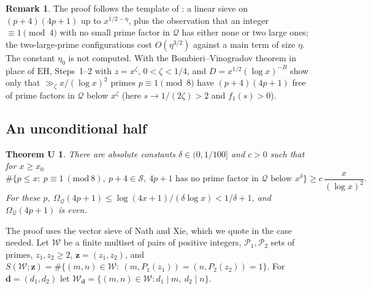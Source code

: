 \documentclass[11pt,reqno]{amsart}
\newtheorem*{thmU}{Theorem U}
\theoremstyle{definition}
\newtheorem{remark}[theorem]{Remark}
\newcommand{\cS}{\mathcal S}
\newcommand{\cQ}{\mathcal Q}
\newcommand{\EH}{\mathrm{EH}}
\begin{document}
\begin{remark}
The proof follows the template of \cite[\S6]{FI09}: a linear sieve on
$(p+4)(4p+1)$ up to $x^{1/2-\eta}$, plus the observation that an
integer $\equiv1\pmod 4$ with no small prime factor in $\cQ$ has either
none or two large ones; the two-large-prime configurations cost
$O(\eta^{3/2})$ against a main term of size $\eta$.  The constant $\eta_0$
is not computed.  With the Bombieri--Vinogradov theorem in place of
$\EH$, Steps~1--2 with $z=x^\zeta$, $0<\zeta<1/4$, and $D=x^{1/2}(\log x)^{-B}$
show only that $\gg_\zeta x/(\log x)^2$ primes $p\equiv1\pmod8$ have
$(p+4)(4p+1)$ free of prime factors in $\cQ$ below $x^\zeta$
(here $s\to1/(2\zeta)>2$ and $f_1(s)>0$).
\end{remark}

\subsection{An unconditional half}

\begin{thmU}
There are absolute constants $\delta\in(0,1/100]$ and $c>0$ such that for
$x\ge x_0$
\[
\#\{p\le x:\ p\equiv1\ (\mathrm{mod}\ 8),\ p+4\in\cS,\ 4p+1\text{ has no prime factor in }\cQ\text{ below }x^\delta\}\ge c\,\frac x{(\log x)^2}.
\]
For these $p$, $\Omega_\cQ(4p+1)\le\log(4x+1)/(\delta\log x)<1/\delta+1$,
and $\Omega_\cQ(4p+1)$ is even.
\end{thmU}

The proof uses the vector sieve of Nath and Xie, which we quote in the
case needed.  Let $\mathcal W$ be a finite multiset of pairs of positive
integers, $\mathcal P_1,\mathcal P_2$ sets of primes, $z_1,z_2\ge2$,
$\mathbf z=(z_1,z_2)$, and
$S(\mathcal W;\mathbf z)=\#\{(m,n)\in\mathcal W:\ (m,P_1(z_1))=(n,P_2(z_2))=1\}$.
For $\mathbf d=(d_1,d_2)$ let $\mathcal W_{\mathbf d}=\{(m,n)\in\mathcal W:
d_1\mid m,\ d_2\mid n\}$.
\end{document}
